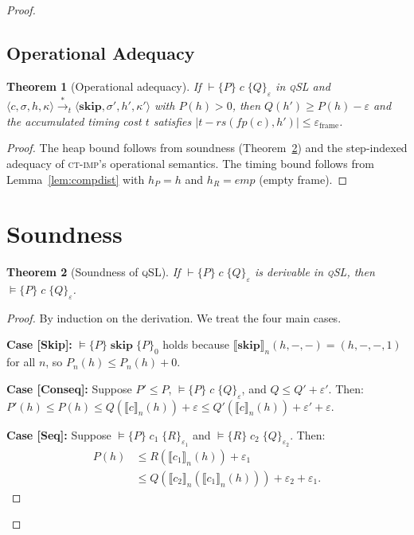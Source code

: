 \documentclass[acmsmall,sigplan,anonymous,review,screen]{acmart}
\theoremstyle{plain}
\newtheorem{theorem}{Theorem}[section]
\theoremstyle{definition}
\newcommand{\qSL}{\textsc{qSL}\xspace}
\newcommand{\CTIMP}{\textsc{ct-imp}\xspace}
\newcommand{\rs}{\mathit{rs}}
\newcommand{\fp}{\mathit{fp}}
\newcommand{\emp}{\mathit{emp}}
\newcommand{\defect}{\varepsilon}
\begin{document}
\begin{proof}
\subsection{Operational Adequacy}
\label{sec:semantics:adequacy}

\begin{theorem}[Operational adequacy]
\label{thm:adequacy}
  If $\vdash \{P\}\; c\; \{Q\}_\defect$ in \qSL and
  $\langle c, \sigma, h, \kappa \rangle \xrightarrow{*}_t
  \langle \mathbf{skip}, \sigma', h', \kappa' \rangle$
  with $P(h) > 0$, then $Q(h') \geq P(h) - \defect$ and the
  accumulated timing cost $t$ satisfies
  $|t - \rs(\fp(c), h')| \leq \defect_{\mathrm{frame}}$.
\end{theorem}

\begin{proof}
  The heap bound follows from soundness (Theorem~\ref{thm:soundness})
  and the step-indexed adequacy of \CTIMP's operational semantics.
  The timing bound follows from Lemma~\ref{lem:compdist} with $h_P = h$
  and $h_R = \emp$ (empty frame).
\end{proof}

\section{Soundness}
\label{sec:soundness}

\begin{theorem}[Soundness of \qSL]
\label{thm:soundness}
  If $\vdash \{P\}\; c\; \{Q\}_\defect$ is derivable in \qSL, then
  $\vDash \{P\}\; c\; \{Q\}_\defect$.
\end{theorem}

\begin{proof}
  By induction on the derivation.  We treat the four main cases.

  \medskip
  \noindent\textbf{Case [Skip]:}
  $\vDash \{P\}\; \mathbf{skip}\; \{P\}_0$ holds because
  $\llbracket \mathbf{skip} \rrbracket_n(h, -, -) = (h, -, -, 1)$
  for all $n$, so $P_n(h) \leq P_n(h) + 0$.

  \medskip
  \noindent\textbf{Case [Conseq]:}
  Suppose $P' \leq P$, $\vDash \{P\}\; c\; \{Q\}_\defect$, and
  $Q \leq Q' + \defect'$.  Then:
  $P'(h) \leq P(h) \leq Q(\llbracket c \rrbracket_n(h)) + \defect
  \leq Q'(\llbracket c \rrbracket_n(h)) + \defect' + \defect$.

  \medskip
  \noindent\textbf{Case [Seq]:}
  Suppose $\vDash \{P\}\; c_1\; \{R\}_{\defect_1}$ and
  $\vDash \{R\}\; c_2\; \{Q\}_{\defect_2}$.  Then:
  \begin{align*}
    P(h) &\leq R(\llbracket c_1 \rrbracket_n(h)) + \defect_1 \\
    &\leq Q(\llbracket c_2 \rrbracket_n(\llbracket c_1 \rrbracket_n(h))) + \defect_2 + \defect_1.
  \end{align*}


\end{proof}
\end{proof}
\end{document}
